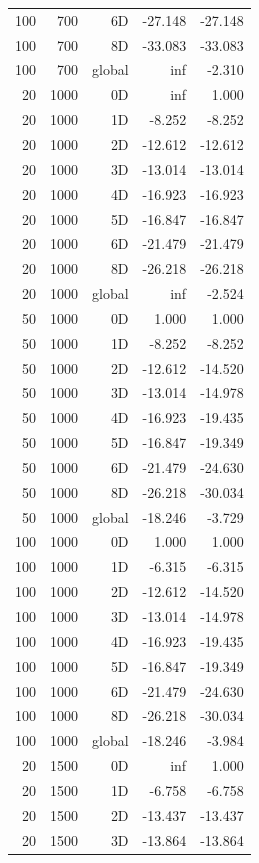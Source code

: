 \begin{longtable}{rrrrr}
100 & 700 & 6D & -27.148 & -27.148 \\
100 & 700 & 8D & -33.083 & -33.083 \\
100 & 700 & global & inf & -2.310 \\
20 & 1000 & 0D & inf & 1.000 \\
20 & 1000 & 1D & -8.252 & -8.252 \\
20 & 1000 & 2D & -12.612 & -12.612 \\
20 & 1000 & 3D & -13.014 & -13.014 \\
20 & 1000 & 4D & -16.923 & -16.923 \\
20 & 1000 & 5D & -16.847 & -16.847 \\
20 & 1000 & 6D & -21.479 & -21.479 \\
20 & 1000 & 8D & -26.218 & -26.218 \\
20 & 1000 & global & inf & -2.524 \\
50 & 1000 & 0D & 1.000 & 1.000 \\
50 & 1000 & 1D & -8.252 & -8.252 \\
50 & 1000 & 2D & -12.612 & -14.520 \\
50 & 1000 & 3D & -13.014 & -14.978 \\
50 & 1000 & 4D & -16.923 & -19.435 \\
50 & 1000 & 5D & -16.847 & -19.349 \\
50 & 1000 & 6D & -21.479 & -24.630 \\
50 & 1000 & 8D & -26.218 & -30.034 \\
50 & 1000 & global & -18.246 & -3.729 \\
100 & 1000 & 0D & 1.000 & 1.000 \\
100 & 1000 & 1D & -6.315 & -6.315 \\
100 & 1000 & 2D & -12.612 & -14.520 \\
100 & 1000 & 3D & -13.014 & -14.978 \\
100 & 1000 & 4D & -16.923 & -19.435 \\
100 & 1000 & 5D & -16.847 & -19.349 \\
100 & 1000 & 6D & -21.479 & -24.630 \\
100 & 1000 & 8D & -26.218 & -30.034 \\
100 & 1000 & global & -18.246 & -3.984 \\
20 & 1500 & 0D & inf & 1.000 \\
20 & 1500 & 1D & -6.758 & -6.758 \\
20 & 1500 & 2D & -13.437 & -13.437 \\
20 & 1500 & 3D & -13.864 & -13.864 \\

\end{longtable}
